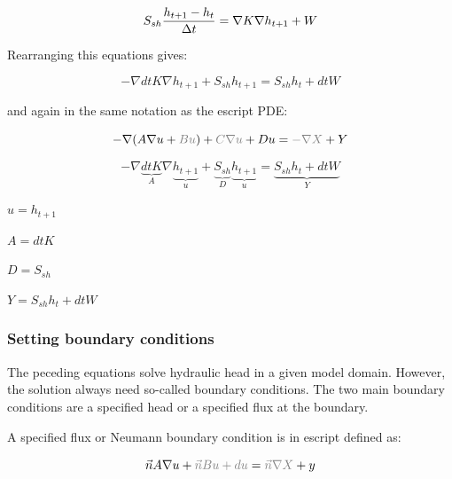 \documentclass[11pt]{article}
\begin{document}
\begin{equation}
 	S_{sh} {h_{t+1} - h_t \over{\Delta t}} = \nabla K  \nabla h_{t+1} + W
\end{equation}

Rearranging this equations gives:

\begin{equation}
   - \nabla dt K \nabla h_{t+1} + S_{sh} h_{t+1} =  S_{sh} h_t + dt W 
\end{equation}

and again in the same notation as the escript PDE:

\begin{equation}
    - \nabla (A \nabla u + {\color{gray}B u} ) + {\color{gray}C \nabla u} + D u = {\color{gray}- \nabla X} + Y
\end{equation}

\begin{equation}
   - \nabla \underbrace{dt K}_A \nabla \underbrace{h_{t+1}}_u + \underbrace{S_{sh}}_D \underbrace{h_{t+1}}_u =  \underbrace{S_{sh} h_t + dt W }_Y 
\end{equation}







$u = h_{t+1}$

$A = dt K$

$D = S_{sh} $

$Y = S_{sh} h_t + dt W $

\subsubsection{Setting boundary conditions}

The peceding equations solve hydraulic head in a given model domain. However, the solution always need so-called boundary conditions. The two main boundary conditions are a specified head or a specified flux at the boundary. 

A specified flux or Neumann boundary condition is in escript defined as:

\begin{equation}
	\vec n A \nabla u + {\color{gray}\vec n B u + d u} = {\color{gray} \vec n \nabla X } + y
\end{equation}
\end{document}
